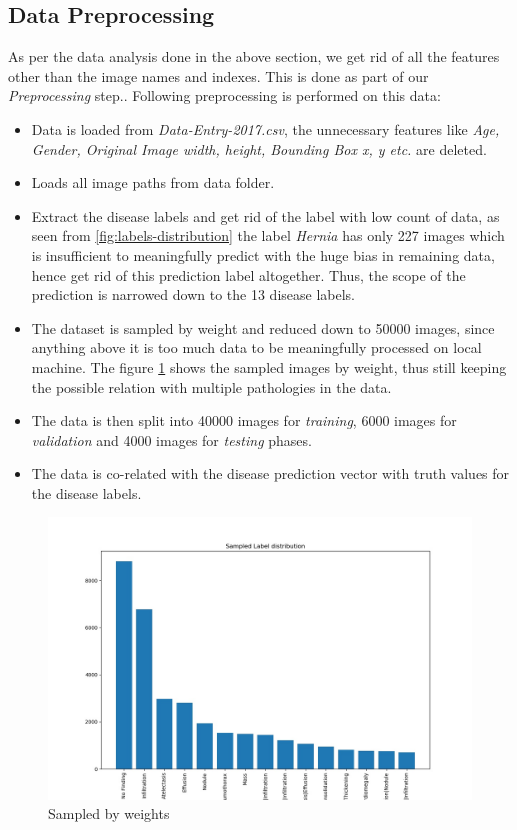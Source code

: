 \documentclass{article}
\begin{document}
    \subsection{Data Preprocessing}
    As per the data analysis done in the above section, we get rid of all the features other than the image names and indexes. This is done as part of our \textit{Preprocessing} step.\cite{github-proj}. Following preprocessing is performed on this data:
    \begin{itemize}
        \item Data is loaded from \textit{Data-Entry-2017.csv}, the unnecessary features like \textit{Age, Gender, Original Image width, height, Bounding Box x, y etc.} are deleted. 
        \item Loads all image paths from data folder.
        \item Extract the disease labels and get rid of the label with low count of data, as seen from \ref{fig:labels-distribution} the label \textit{Hernia} has only 227 images which is insufficient to meaningfully predict with the huge bias in remaining data, hence get rid of this prediction label altogether. Thus, the scope of the prediction is narrowed down to the 13 disease labels. 
        \item The dataset is sampled by weight and reduced down to 50000 images, since anything above it is too much data to be meaningfully processed on local machine. The figure \ref{fig:sampled-disease} shows the sampled images by weight, thus still keeping the possible relation with multiple pathologies in the data.
        \item The data is then split into 40000 images for \textit{training}, 6000 images for \textit{validation} and 4000 images for \textit{testing} phases.
        \item The data is co-related with the disease prediction vector with truth values for the disease labels.
    \end{itemize} 
    
    \begin{figure}
        \includegraphics[width=\linewidth]{./images/sampled_disease_distribution.jpg}
        \caption{Sampled by weights}
        \label{fig:sampled-disease}
    \end{figure}
\end{document}
